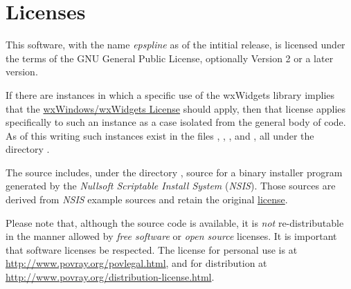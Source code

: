 \chapter{Licenses}%
\label{chap:licenses}

	This software, with the name \emph{epspline} as of the intitial
	release, is licensed under the terms of the GNU
	General Public License, optionally Version 2 or a later version.

	If there are instances in which a specific use of the
	wxWidgets library implies that the
	\href{http://www.wxwidgets.org/about/newlicen.htm}{wxWindows/wxWidgets License}
	should apply, then that license applies specifically
	to such an instance as a case isolated from the general
	body of code. As of this writing such instances exist in the files
	, ,
	, and ,
	all under the directory .

	The \IXpkg{} source includes, under the directory
	, source for a binary installer program
	generated by the
	\emph{Nullsoft Scriptable Install System} (\emph{NSIS}). Those
	sources are derived from \emph{NSIS} example sources and
	retain the original
	\href{http://nsis.sourceforge.net/License}{license}.
	
	Please note that, although the source code is available,
	it is \emph{not} re-distributable in the manner allowed
	by \emph{free software} or \emph{open source} licenses.
	It is important that software licenses be respected.
	The \IXpov{} license for personal use is at
	\url{http://www.povray.org/povlegal.html}, and for distribution
	at \url{http://www.povray.org/distribution-license.html}.


